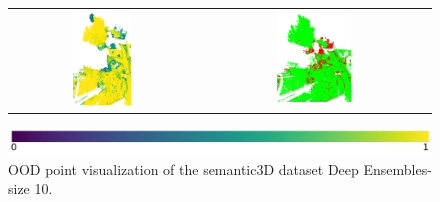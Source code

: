 \begin{figure}[h!]
\begin{tabular}{cc}
                \includegraphics[width=0.33\textwidth, height=0.18\textheight]{images/ood_imgs/de_sem3d/de_prob_10_3.png}& 
                \includegraphics[width=0.33\textwidth, height=0.18\textheight]{images/ood_imgs/de_sem3d/de_ood_auroc_3.png}\\
            \end{tabular}
            \includegraphics[scale=0.45]{images/prob_legend.pdf}
            \caption{OOD point visualization of the semantic3D dataset Deep Ensembles-size 10.}
            \label{fig:de_ood_auroc_sem3d_prob}
        \end{figure}
